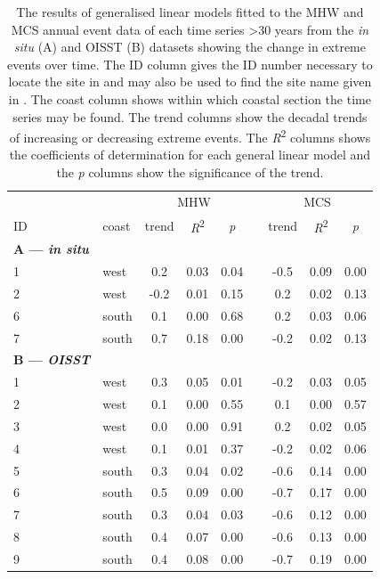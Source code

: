 \documentclass[a4paper,10pt,review]{elsarticle}
\begin{document}
\begin{table}[]
\centering
\caption{\small The results of generalised linear models fitted to the MHW and MCS annual event data of each time series >30 years from the \emph{in situ} (A) and OISST (B) datasets showing the change in extreme events over time. The ID column gives the ID number necessary to locate the site in  and may also be used to find the site name given in . The coast column shows within which coastal section the time series may be found. The trend columns show the decadal trends of increasing or decreasing extreme events. The \emph{R}\textsuperscript{2} columns shows the coefficients of determination for each general linear model and the \emph{p} columns show the significance of the trend.}
\label{table4}
\begin{tiny}
\begin{tabular}{llccccccc}
\toprule
&& \multicolumn{3}{c}{MHW} & \phantom{abc} & \multicolumn{3}{c}{MCS} \\
\cmidrule{3-5} \cmidrule{7-9}
ID & coast & trend & \emph{R}\textsuperscript{2} & \emph{p} && trend & \emph{R}\textsuperscript{2} & \emph{p} \\
\midrule
{\bf{A} --- \emph{in situ}} \\
1 & west & 0.2 & 0.03 & 0.04 && -0.5 & 0.09 & 0.00 \\
  2 & west & -0.2 & 0.01 & 0.15 && 0.2 & 0.02 & 0.13 \\
  6 & south & 0.1 & 0.00 & 0.68 && 0.2 & 0.03 & 0.06 \\
  7 & south & 0.7 & 0.18 & 0.00 && -0.2 & 0.02 & 0.13 \\
{\bf{B} --- \emph{OISST}} \\
  1 & west & 0.3 & 0.05 & 0.01 && -0.2 & 0.03 & 0.05 \\
  2 & west & 0.1 & 0.00 & 0.55 && 0.1 & 0.00 & 0.57 \\
  3 & west & 0.0 & 0.00 & 0.91 && 0.2 & 0.02 & 0.05 \\
  4 & west & 0.1 & 0.01 & 0.37 && -0.2 & 0.02 & 0.06 \\
  5 & south & 0.3 & 0.04 & 0.02 && -0.6 & 0.14 & 0.00 \\
  6 & south & 0.5 & 0.09 & 0.00 && -0.7 & 0.17 & 0.00 \\
  7 & south & 0.3 & 0.04 & 0.03 && -0.6 & 0.12 & 0.00 \\
  8 & south & 0.4 & 0.07 & 0.00 && -0.6 & 0.13 & 0.00 \\
  9 & south & 0.4 & 0.08 & 0.00 && -0.7 & 0.19 & 0.00 \\

\end{tabular}
\end{tiny}
\end{table}
\end{document}
